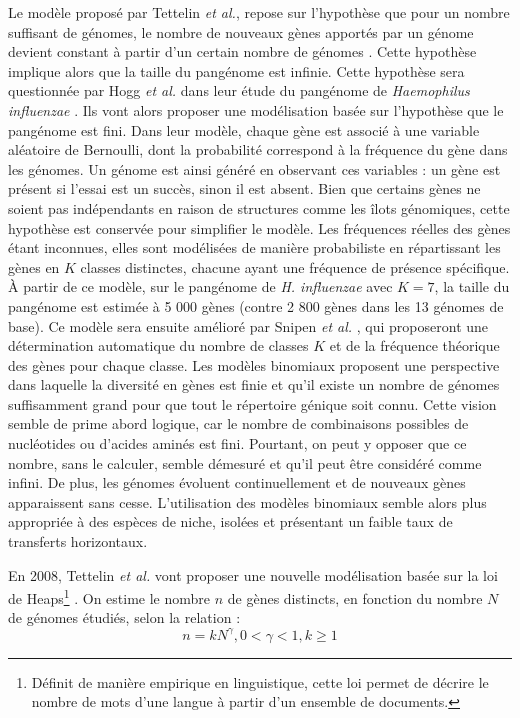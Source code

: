 Le modèle proposé par Tettelin \textit{et al.}, repose sur l'hypothèse que pour un nombre suffisant de génomes, le nombre de nouveaux gènes apportés par un génome devient constant à partir d'un certain nombre de génomes \cite{tettelin_genome_2005}. Cette hypothèse implique alors que la taille du pangénome est infinie. Cette hypothèse sera questionnée par Hogg \textit{et al.} dans leur étude du pangénome de \textit{Haemophilus influenzae} \cite{hogg_characterization_2007}. Ils vont alors proposer une modélisation basée sur l'hypothèse que le pangénome est fini. Dans leur modèle, chaque gène est associé à une variable aléatoire de Bernoulli, dont la probabilité correspond à la fréquence du gène dans les génomes. Un génome est ainsi généré en observant ces variables : un gène est présent si l’essai est un succès, sinon il est absent. Bien que certains gènes ne soient pas indépendants en raison de structures comme les îlots génomiques, cette hypothèse est conservée pour simplifier le modèle. Les fréquences réelles des gènes étant inconnues, elles sont modélisées de manière probabiliste en répartissant les gènes en $K$ classes distinctes, chacune ayant une fréquence de présence spécifique. À partir de ce modèle, sur le pangénome de \textit{H. influenzae} avec $K=7$, la taille du pangénome est estimée à 5 000 gènes (contre 2 800 gènes dans les 13 génomes de base). Ce modèle sera ensuite amélioré par Snipen \textit{et al.} \cite{snipen_microbial_2009}, qui proposeront une détermination automatique du nombre de classes $K$ et de la fréquence théorique des gènes pour chaque classe. Les modèles binomiaux proposent une perspective dans laquelle la diversité en gènes est finie et qu'il existe un nombre de génomes suffisamment grand pour que tout le répertoire génique soit connu. Cette vision semble de prime abord logique, car le nombre de combinaisons possibles de nucléotides ou d'acides aminés est fini. Pourtant, on peut y opposer que ce nombre, sans le calculer, semble démesuré et qu'il peut être considéré comme infini. De plus, les génomes évoluent continuellement et de nouveaux gènes apparaissent sans cesse. L'utilisation des modèles binomiaux semble alors plus appropriée à des espèces de niche, isolées et présentant un faible taux de transferts horizontaux.

En 2008, Tettelin \textit{et al.} vont proposer une nouvelle modélisation basée sur la loi de Heaps\footnote{Définit de manière empirique en linguistique, cette loi permet de décrire le nombre de mots d'une langue à partir d'un ensemble de documents.} \cite{tettelin_comparative_2008}. On estime le nombre $n$ de gènes distincts, en fonction du nombre $N$ de génomes étudiés, selon la relation :
\begin{equation}
    n=kN^\gamma, 0<\gamma<1,k\geq1
\end{equation}

